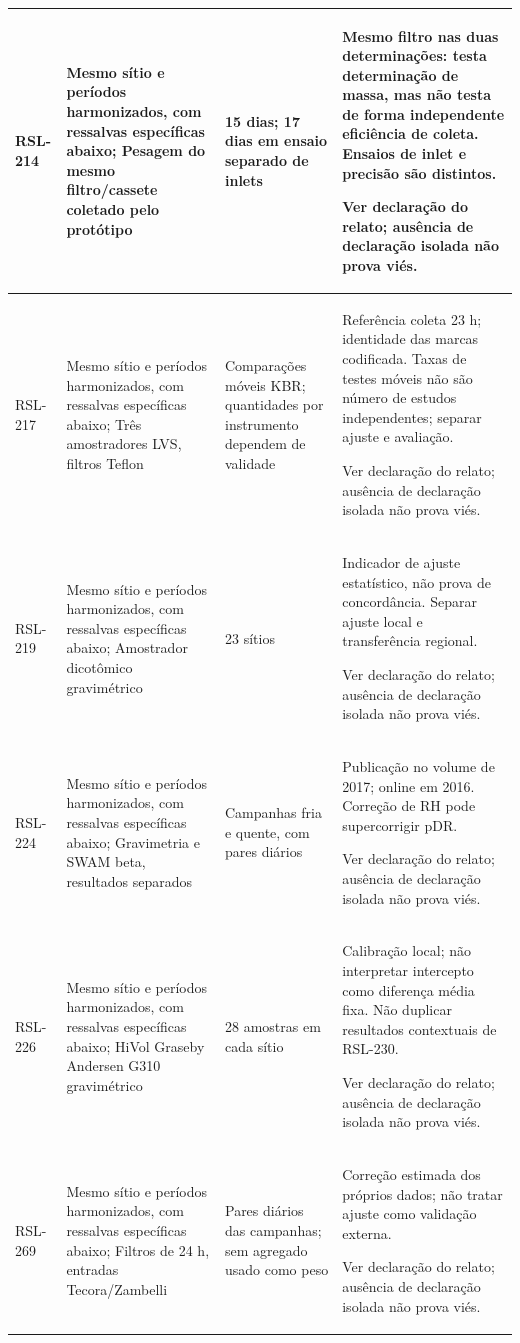\begin{longtable}{|P{0.12\textwidth}|P{0.28\textwidth}|P{0.28\textwidth}|P{\arrayrulewidth\relax}|}
RSL-214 & Mesmo sítio e períodos harmonizados, com ressalvas específicas abaixo; Pesagem do mesmo filtro/cassete coletado pelo protótipo & 15 dias; 17 dias em ensaio separado de inlets & Mesmo filtro nas duas determinações: testa determinação de massa, mas não testa de forma independente eficiência de coleta. Ensaios de inlet e precisão são distintos.\par\medskip Ver declaração do relato; ausência de declaração isolada não prova viés.\\\hline
RSL-217 & Mesmo sítio e períodos harmonizados, com ressalvas específicas abaixo; Três amostradores LVS, filtros Teflon & Comparações móveis KBR; quantidades por instrumento dependem de validade & Referência coleta 23 h; identidade das marcas codificada. Taxas de testes móveis não são número de estudos independentes; separar ajuste e avaliação.\par\medskip Ver declaração do relato; ausência de declaração isolada não prova viés.\\\hline
RSL-219 & Mesmo sítio e períodos harmonizados, com ressalvas específicas abaixo; Amostrador dicotômico gravimétrico & 23 sítios & Indicador de ajuste estatístico, não prova de concordância. Separar ajuste local e transferência regional.\par\medskip Ver declaração do relato; ausência de declaração isolada não prova viés.\\\hline
RSL-224 & Mesmo sítio e períodos harmonizados, com ressalvas específicas abaixo; Gravimetria e SWAM beta, resultados separados & Campanhas fria e quente, com pares diários & Publicação no volume de 2017; online em 2016. Correção de RH pode supercorrigir pDR.\par\medskip Ver declaração do relato; ausência de declaração isolada não prova viés.\\\hline
RSL-226 & Mesmo sítio e períodos harmonizados, com ressalvas específicas abaixo; HiVol Graseby Andersen G310 gravimétrico & 28 amostras em cada sítio & Calibração local; não interpretar intercepto como diferença média fixa. Não duplicar resultados contextuais de RSL-230.\par\medskip Ver declaração do relato; ausência de declaração isolada não prova viés.\\\hline
RSL-269 & Mesmo sítio e períodos harmonizados, com ressalvas específicas abaixo; Filtros de 24 h, entradas Tecora/Zambelli & Pares diários das campanhas; sem agregado usado como peso & Correção estimada dos próprios dados; não tratar ajuste como validação externa.\par\medskip Ver declaração do relato; ausência de declaração isolada não prova viés.\\\hline

\end{longtable}
